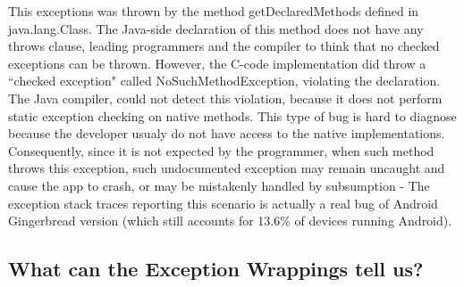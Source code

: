 \documentclass[conference]{IEEEtran}
\begin{document}
This exceptions was thrown by the method getDeclaredMethods defined in java.lang.Class. 
The Java-side declaration of this method does not have any throws clause, 
leading programmers and the compiler to think that no checked exceptions can be thrown.
 However, the C-code implementation did throw a ``checked exception" called NoSuchMethodException, 
violating the declaration. The Java compiler, could not detect this violation, because it does 
not perform static exception checking on native methods. This type of bug is hard to diagnose
because the developer usualy do not have access to the native implementations. 
Consequently, since it is not expected by the programmer, when such method throws 
this exception, such undocumented exception may remain
uncaught and cause the app to crash, or may be mistakenly handled by subsumption - 
The exception stack traces reporting this scenario is actually a real bug of Android 
Gingerbread version (which still accounts for 13.6\% of devices running Android).

\noindent {}


\subsection{What can the Exception Wrappings tell us?}
\end{document}
